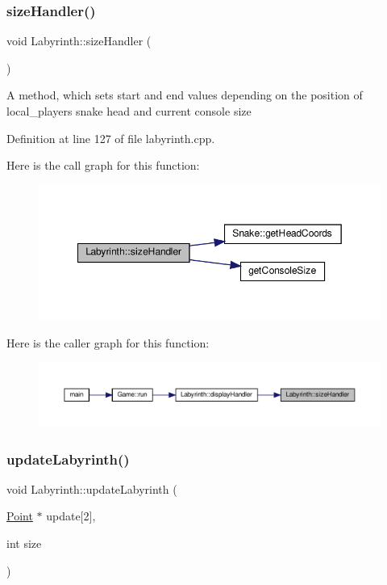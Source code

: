 \subsubsection{\texorpdfstring{sizeHandler()}{sizeHandler()}}
{\footnotesize\ttfamily void Labyrinth\+::size\+Handler (\begin{DoxyParamCaption}{ }\end{DoxyParamCaption})\hspace{0.3cm}{\ttfamily [private]}}

A method, which sets start and end values depending on the position of local\+\_\+player\textquotesingle{}s snake head and current console size 

Definition at line 127 of file labyrinth.\+cpp.

Here is the call graph for this function\+:
\nopagebreak
\begin{figure}[H]
\begin{center}
\leavevmode
\includegraphics[width=349pt]{class_labyrinth_a43994d3b84ed457b1c04595466a61fc6_cgraph}
\end{center}
\end{figure}
Here is the caller graph for this function\+:
\nopagebreak
\begin{figure}[H]
\begin{center}
\leavevmode
\includegraphics[width=350pt]{class_labyrinth_a43994d3b84ed457b1c04595466a61fc6_icgraph}
\end{center}
\end{figure}
\mbox{\label{class_labyrinth_ad533aaa69e845e368a7a08097f7e4ac8}} 
\subsubsection{\texorpdfstring{updateLabyrinth()}{updateLabyrinth()}}
{\footnotesize\ttfamily void Labyrinth\+::update\+Labyrinth (\begin{DoxyParamCaption}\item[{\mbox{\hyperlink{common_8h_aa9cfdb80b4ca12013a2de8a3b9b97981}{Point}} $\ast$}]{update\mbox{[}2\mbox{]},  }\item[{int}]{size }\end{DoxyParamCaption})\hspace{0.3cm}{\ttfamily [private]}}

